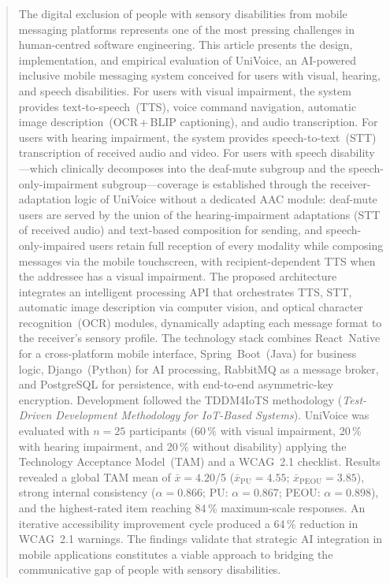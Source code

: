 \documentclass[journal]{IEEEtran}
\begin{document}
	\begin{abstract}
		The digital exclusion of people with sensory disabilities from mobile
		messaging platforms represents one of the most pressing challenges in
		human-centred software engineering.
		This article presents the design, implementation, and empirical
		evaluation of \textsf{UniVoice}, an AI-powered inclusive mobile
		messaging system conceived for users with visual, hearing, and
		speech disabilities. For users with visual impairment, the system provides
		text-to-speech~(TTS), voice command navigation, automatic image
		description~(OCR\,+\,BLIP captioning), and audio transcription.
		For users with hearing impairment, the system provides
		speech-to-text~(STT) transcription of received audio and video.
		For users with speech disability---which clinically decomposes into the
		deaf-mute subgroup and the speech-only-impairment subgroup---coverage is
		established through the receiver-adaptation logic of \textsf{UniVoice}
		without a dedicated AAC module: deaf-mute users are served by the union
		of the hearing-impairment adaptations (STT of received audio) and
		text-based composition for sending, and speech-only-impaired users retain
		full reception of every modality while composing messages via the mobile
		touchscreen, with recipient-dependent TTS when the addressee has a visual
		impairment.
		The proposed architecture integrates an intelligent processing API
		that orchestrates TTS, STT, automatic image description via computer
		vision, and optical character recognition~(OCR) modules, dynamically
		adapting each message format to the receiver's sensory profile.
		The technology stack combines React~Native for a cross-platform mobile
		interface, Spring~Boot~(Java) for business logic, Django~(Python) for
		AI processing, RabbitMQ as a message broker, and PostgreSQL for
		persistence, with end-to-end asymmetric-key encryption.
		Development followed the TDDM4IoTS methodology
		(\textit{Test-Driven Development Methodology for IoT-Based Systems}).
		\textsf{UniVoice} was evaluated with $n{=}25$ participants (60\,\% with visual impairment, 20\,\% with hearing impairment, and 20\,\% without disability) applying the Technology Acceptance Model~(TAM) and a WCAG~2.1 checklist. Results revealed a global TAM mean of $\bar{x}{=}4.20$/5 ($\bar{x}_{\text{PU}}{=}4.55$; $\bar{x}_{\text{PEOU}}{=}3.85$), strong internal consistency ($\alpha{=}0.866$; PU: $\alpha{=}0.867$; PEOU: $\alpha{=}0.898$), and the highest-rated item reaching 84\,\% maximum-scale responses. An iterative accessibility improvement cycle produced a 64\,\%
		reduction in WCAG~2.1 warnings. The findings validate that strategic AI integration in mobile applications constitutes a viable approach to bridging the communicative gap of people with sensory disabilities.
	\end{abstract}
	
\end{document}
